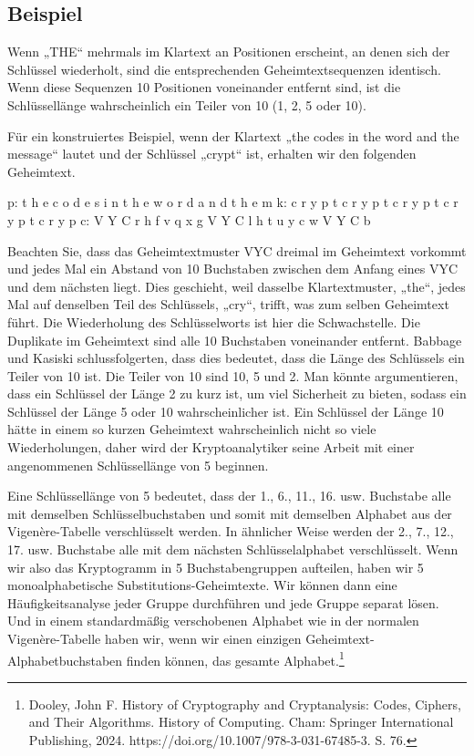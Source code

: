 \documentclass[
  nswissgerman,
  a4paper,
  DIV=11,
  numbers=noendperiod,
  ngerman]{scrreprt}
\newenvironment{Shaded}{\begin{snugshade}}{\end{snugshade}}
\newcommand{\NormalTok}[1]{\textcolor[rgb]{0.00,0.23,0.31}{#1}}
\begin{document}
\subsection{Beispiel}\label{beispiel}

Wenn „THE`` mehrmals im Klartext an Positionen erscheint, an denen sich
der Schlüssel wiederholt, sind die entsprechenden Geheimtextsequenzen
identisch. Wenn diese Sequenzen 10 Positionen voneinander entfernt sind,
ist die Schlüssellänge wahrscheinlich ein Teiler von 10 (1, 2, 5 oder
10).

Für ein konstruiertes Beispiel, wenn der Klartext „the codes in the word
and the message`` lautet und der Schlüssel „crypt`` ist, erhalten wir
den folgenden Geheimtext.

\begin{Shaded}
\begin{Highlighting}[numbers=left,,]
\NormalTok{p: t h e c o d e s i n t h e w o r d a n d t h e m}
\NormalTok{k: c r y p t c r y p t c r y p t c r y p t c r y p}
\NormalTok{c: V Y C r h f v q x g V Y C l h t u y c w V Y C b}
\end{Highlighting}
\end{Shaded}

Beachten Sie, dass das Geheimtextmuster VYC dreimal im Geheimtext
vorkommt und jedes Mal ein Abstand von 10 Buchstaben zwischen dem Anfang
eines VYC und dem nächsten liegt. Dies geschieht, weil dasselbe
Klartextmuster, „the``, jedes Mal auf denselben Teil des Schlüssels,
„cry``, trifft, was zum selben Geheimtext führt. Die Wiederholung des
Schlüsselworts ist hier die Schwachstelle. Die Duplikate im Geheimtext
sind alle 10 Buchstaben voneinander entfernt. Babbage und Kasiski
schlussfolgerten, dass dies bedeutet, dass die Länge des Schlüssels ein
Teiler von 10 ist. Die Teiler von 10 sind 10, 5 und 2. Man könnte
argumentieren, dass ein Schlüssel der Länge 2 zu kurz ist, um viel
Sicherheit zu bieten, sodass ein Schlüssel der Länge 5 oder 10
wahrscheinlicher ist. Ein Schlüssel der Länge 10 hätte in einem so
kurzen Geheimtext wahrscheinlich nicht so viele Wiederholungen, daher
wird der Kryptoanalytiker seine Arbeit mit einer angenommenen
Schlüssellänge von 5 beginnen.

Eine Schlüssellänge von 5 bedeutet, dass der 1., 6., 11., 16. usw.
Buchstabe alle mit demselben Schlüsselbuchstaben und somit mit demselben
Alphabet aus der Vigenère-Tabelle verschlüsselt werden. In ähnlicher
Weise werden der 2., 7., 12., 17. usw. Buchstabe alle mit dem nächsten
Schlüsselalphabet verschlüsselt. Wenn wir also das Kryptogramm in 5
Buchstabengruppen aufteilen, haben wir 5 monoalphabetische
Substitutions-Geheimtexte. Wir können dann eine Häufigkeitsanalyse jeder
Gruppe durchführen und jede Gruppe separat lösen. Und in einem
standardmäßig verschobenen Alphabet wie in der normalen Vigenère-Tabelle
haben wir, wenn wir einen einzigen Geheimtext-Alphabetbuchstaben finden
können, das gesamte Alphabet.\footnote{Dooley, John F. History of
  Cryptography and Cryptanalysis: Codes, Ciphers, and Their Algorithms.
  History of Computing. Cham: Springer International Publishing, 2024.
  https://doi.org/10.1007/978-3-031-67485-3. S. 76.}
\end{document}
